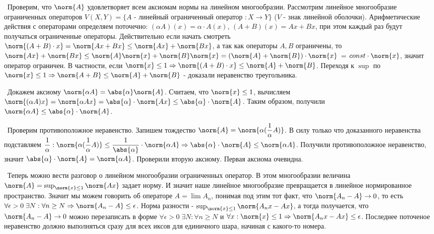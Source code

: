 \medskip
\noindent\textbullet~Проверим, что $\norm{A}$ удовлетворяет всем аксиомам нормы на линейном многообразии. Рассмотрим линейное многообразие ограниченных операторов $V(X, Y)
= \{ A $ - линейный ограниченный оператор $: X \to Y\}$ ($V$ - знак линейной оболочки). Арифметические действия с операторами определяем поточечно: $(\alpha A)(x) = \alpha \cdot A(x)$, $(A + B)(x) = 
A x + B x$, при этом каждый раз будут получаться ограниченные операторы. Действительно если начать смотреть $\norm{(A + B) \cdot x} = \norm{A x + B x} \le \norm{A x} + 
\norm{B x}$, а так как операторы $A, B$ ограничены, то $\norm{A x} + \norm{B x} \le \norm{A} \norm{x} + \norm{B} \norm{x} = (\norm{A} + \norm{B}) \cdot \norm{x}$ = $const
\cdot \norm{x}$, значит оператор ограничен. В частности, если $\norm{x} \le 1 \Rightarrow \norm{(A + B) \cdot x} \le \norm{A} + \norm{B}$. Переходя к $\sup$ по $\norm{x}
\le 1 \Rightarrow \norm{A + B} \le \norm{A} + \norm{B}$ - доказали неравенство треугольника.

\medskip
\noindent\textbullet~Докажем аксиому $\norm{\alpha A} = \abs{\alpha}\norm{A}$. Считаем, что $\norm{x} \le 1$, вычисляем $\norm{(\alpha A)x} = \norm{\alpha A x} = 
\abs{\alpha} \cdot \norm{A x} \le \abs{\alpha} \cdot \norm{A}$. Таким образом, получили $\norm{\alpha A} \le \abs{\alpha} \cdot \norm{A}$.

\smallskip
\noindent\textbullet~Проверим противоположное неравенство. Запишем тождество $\norm{A} = \norm{\alpha (\dfrac{1}{\alpha} A)}$. В силу только что доказанного неравенства
подставляем $\dfrac{1}{\alpha}: \norm{\alpha (\dfrac{1}{\alpha} A)} \le \dfrac{1}{\abs{\alpha}} \cdot \norm{\alpha A} \Rightarrow \abs{\alpha} \cdot \norm{A} \le  
\norm{\alpha A}$. Получили противоположное неравенство, значит $\abs{\alpha} \cdot \norm{A} = \norm{\alpha A}$. Проверили вторую аксиому. Первая аксиома очевидна. 

\medskip 
\noindent\textbullet~Теперь можно вести разговор о линейном многообразии ограниченных оператор. В этом многообразии величина $\norm{A} = \sup_{\norm{x} \le 1} \norm{A x}$
задает норму. И значит наше линейное многообразие превращается в линейное нормированное пространство. Значит мы можем говорить об операторе $A = \lim A_n$, понимая под 
этим тот факт, что $\norm{A_n - A} \to 0$, то есть $\forall \epsilon > 0 \; \exists N : \forall n \ge N \Rightarrow \norm{A_n - A} \le \epsilon$. Норма разности - 
$\sup_{\norm{x} \le 1} \norm{A_n x - A x}$, а тогда получается, что $\norm{A_n - A} \to 0$ можно перезаписать в форме $\forall \epsilon > 0 \; \exists N : \forall n \ge 
N$ и $\forall x : \norm{x} \le 1 \Rightarrow \norm{A_n x - A x} \le \epsilon$. Последнее поточеное неравенство должно выполняться сразу для всех иксов для единичного 
шара, начиная с какого-то номера.
